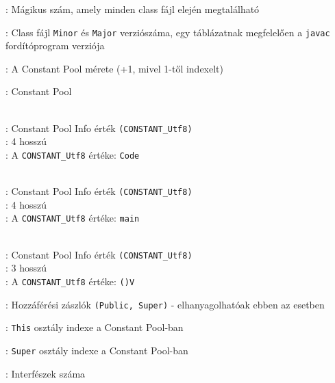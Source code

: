 \begin{compactitem}
\setlength\itemsep{-5px}
\item {}: Mágikus szám, amely minden class fájl elején megtalálható
\item {} : Class fájl \lstinline{Minor} és \lstinline{Major} verziószáma, egy táblázatnak megfelelően a \lstinline{javac} fordítóprogram verziója
\item {}: A Constant Pool mérete (+1, mivel 1-től indexelt)
\item {}: Constant Pool
\begin{compactitem}
    \setlength\itemsep{-5px}
    \item {}   \\
    : Constant Pool Info érték \lstinline{(CONSTANT_Utf8)} \\
    : 4 hosszú \\
    : A \lstinline{CONSTANT_Utf8} értéke: \lstinline{Code}
    \item {}   \\
    : Constant Pool Info érték \lstinline{(CONSTANT_Utf8)} \\
    : 4 hosszú \\
    : A \lstinline{CONSTANT_Utf8} értéke: \lstinline{main}
    \item {}   \\
    : Constant Pool Info érték \lstinline{(CONSTANT_Utf8)} \\
    : 3 hosszú \\
    : A \lstinline{CONSTANT_Utf8} értéke: \lstinline{()V}
\end{compactitem}
\item {}: Hozzáférési zászlók \lstinline{(Public, Super)} - elhanyagolhatóak ebben az esetben
\item {}: \lstinline{This} osztály indexe a Constant Pool-ban
\item {}: \lstinline{Super} osztály indexe a Constant Pool-ban
\item {}: Interfészek száma

\end{compactitem}

